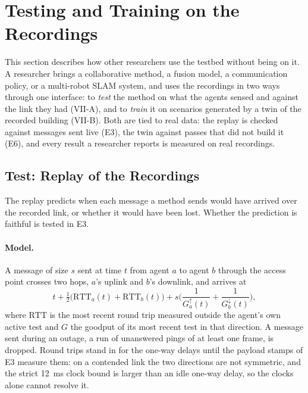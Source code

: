 \section{Testing and Training on the Recordings}
\label{sec:gym}
This section describes how other researchers use the testbed without
being on it. A researcher brings a collaborative method, a fusion model, a
communication policy, or a multi-robot SLAM system, and uses the
recordings in two ways through one interface: to \emph{test} the method
on what the agents sensed and against the link they had (VII-A), and to
\emph{train} it on scenarios generated by a twin of the recorded building
(VII-B). Both are tied to real data: the replay is checked against
messages sent live (E3), the twin against passes that did not build it
(E6), and every result a researcher reports is measured on real
recordings.

\subsection{Test: Replay of the Recordings}
\label{sec:replay}
The replay predicts when each message a method sends would have arrived
over the recorded link, or whether it would have been lost. Whether the
prediction is faithful is tested in E3.

\paragraph{Model.} A message of size $s$ sent at time $t$ from agent $a$
to agent $b$ through the access point crosses two hops, $a$'s uplink and
$b$'s downlink, and arrives at
\begin{equation}
  t + \tfrac{1}{2}\big(\mathrm{RTT}_a(t) + \mathrm{RTT}_b(t)\big)
    + s\Big(\frac{1}{G^{\uparrow}_a(t)} + \frac{1}{G^{\downarrow}_b(t)}\Big),
  \label{eq:replay}
\end{equation}
where $\mathrm{RTT}$ is the most recent round trip measured outside the
agent's own active test and $G$ the goodput of its most recent test in
that direction. A message sent during an outage, a run of unanswered
pings of at least one frame, is dropped. Round trips stand in for the
one-way delays until the payload stamps of E3 measure them: on a
contended link the two directions are not symmetric, and the strict
\SI{12}{\milli\second} clock bound is larger than an idle one-way delay,
so the clocks alone cannot resolve it.

